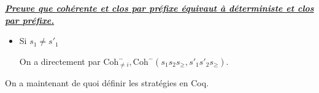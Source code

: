 \documentclass[a4paper,12ptCOUCOU
]{article}
\newlength{\mydepth}
\newlength{\myheight}
\newenvironment{answer}[1]
{\vspace{0.5cm}\begin{minipage}{\linewidth}\textbf{\textit{\underline{#1}}}\par\begin{lrbox}{\mybox}\quad\begin{minipage}{\linewidth}\color{black}\setlength{\parskip}{10pt}}
{\end{minipage}\end{lrbox}
\settodepth{\mydepth}{\usebox{\mybox}}
\settoheight{\myheight}{\usebox{\mybox}}
\addtolength{\myheight}{\mydepth}
\noindent\makebox[0pt]{
  \color{gray}\hspace{-0pt}\rule[-\mydepth]{1pt}{\myheight}}
\usebox{\mybox}
\end{minipage}
  }
\begin{document}
\begin{answer}{Preuve que cohérente et clos par préfixe équivaut à déterministe et clos par préfixe.}
\begin{itemize}
Comme $\sigma$ est clos par préfixe, on a $s_1 s_2, s'_1 s'_2 \in \sigma$.
Par déterminisme, on a alors $s_2 = s'_2$.

Comme on a $s_\geq, s'_\geq \in \sigma |_{G\backslash s_1,s_2}$, par IH,
on a $\text{Coh}^-(s_\geq, s'_\geq)$

Donc on a $\text{Coh}^+(s_2 s_\geq, s'_2 s'_\geq)$ et finalement,
$\text{Coh}^-(s_1 s_2 s_\geq, s'_1 s'_2 s'_\geq)$ grâce à
$\text{Coh}_i^+$ et $\text{Coh}_i^-$.


\item Si $s_1 \neq s'_1$

On a directement par $\text{Coh}_{\neq i}^-, \text{Coh}^-(s_1 s_2 s_\geq, s'_1 s'_2 s_\geq)$.

\end{itemize}
\end{answer}

On a maintenant de quoi définir les stratégies en Coq.
\printbibliography
\end{document}
